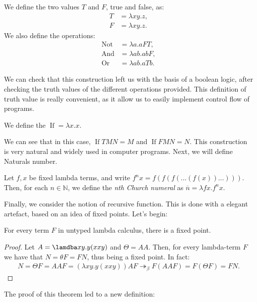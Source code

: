 \begin{definition} \label{def:untyped-natural} 
  We define the two values $T$ and $F$, true and false, as:
  \begin{align*}
    T &= \lambda xy.z,\\
    F &= \lambda xy.z.
  \end{align*}
  We also define the operations:
  \begin{align*}
    \operatorname{Not} &= \lambda a.aFT,\\
    \operatorname{And} &= \lambda ab.abF,\\
    \operatorname{Or} &= \lambda ab.aTb.
  \end{align*}
\end{definition}

We can check that this construction left us with the basis of a boolean logic, after checking the truth values of the different operations provided. This definition of truth value is really convenient, as it allow us to easily implement control flow of programs.

\begin{definition}
  We define the $\operatorname{If} = \lambda x.x$.  
\end{definition}

We can see that in this case, $\operatorname{If} T M N = M$ and $\operatorname{If} F M N = N$. This construction is very natural and widely used in computer programs. Next, we will define Naturals number. 

\begin{definition} \label{def:untyped-natural} 
Let $f,x$ be fixed lambda terms, and write $f^nx = f(f(f(...(f(x))...)))$. Then, for each $n \in \mathbb N$, we define the \emph{nth Church numeral} as $\overline n=\lambda fx.f^nx$.
\end{definition}

Finally, we consider the notion of recursive function. This is done with a elegant artefact, based on an idea of fixed points. Let's begin:



\begin{theorem}
  For every term $F$ in untyped lambda calculus, there is a fixed point.
\end{theorem}
\begin{proof}
  Let $A=\lamdba xy.y(xxy)$ and $\Theta =AA$. Then, for every lambda-term $F$ we have that $N=\theta F = FN$, thus being a fixed point. In fact:
  \begin{align*}
    N = \Theta F = AAF = (\lambda xy.y(xxy))AF \twoheadrightarrow_\beta F(AAF) = F(\Theta F) = FN.
  \end{align*}
\end{proof}
The proof of this theorem led to a new definition:

